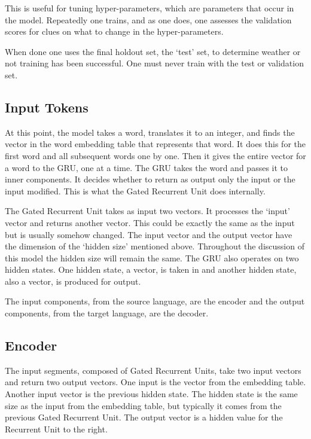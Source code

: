 This is useful for tuning hyper-parameters, which are parameters that occur in the model. Repeatedly one trains, and as one does, one assesses the validation scores for clues on what to change in the hyper-parameters. 

When done one uses the final holdout set, the `test' set, to determine weather or not training has been successful. One must never train with the test or validation set.

\subsection{Input Tokens}

At this point, the model takes a word, translates it to an integer, and finds the vector in the word embedding table that represents that word. It does this for the first word and all subsequent words one by one. Then it gives the entire vector for a word to the GRU, one at a time. The GRU takes the word and passes it to inner components. It decides whether to return as output only the input or the input modified. This is what the Gated Recurrent Unit does internally.

The Gated Recurrent Unit takes as input two vectors. It processes the `input' vector and returns another vector. This could be exactly the same as the input but is usually somehow changed. The input vector and the output vector have the dimension of the `hidden size' mentioned above. Throughout the discussion of this model the hidden size will remain the same. The GRU also operates on two hidden states. One hidden state, a vector, is taken in and another hidden state, also a vector, is produced for output.

The input components, from the source language, are the encoder and the output components, from the target language, are the decoder.



\subsection{Encoder}

The input segments, composed of Gated Recurrent Units, take two input vectors and return two output vectors. One input is the vector from the embedding table. Another input vector is the previous hidden state. The hidden state is the same size as the input from the embedding table, but typically it comes from the previous Gated Recurrent Unit. The output vector is a hidden value for the Recurrent Unit to the right. %

